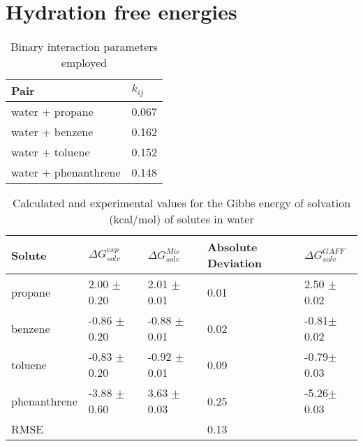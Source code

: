 \section{Hydration free energies}


\begin{table}[h]
\center
  \caption{Binary interaction parameters employed}
  \label{tbl:kij}
  \begin{tabular}{ll}
    \hline
      Pair & $k_{ij}$ \\
    \hline
    water  + propane      & 0.067  \\
    water  + benzene      & 0.162 \\  
    water  + toluene      & 0.152 \\
    water  + phenanthrene & 0.148  \\
    \hline
  \end{tabular}

\end{table}

\begin{table*}[h]
\center
  \caption{Calculated and experimental values for the Gibbs energy of solvation (kcal/mol) of solutes in water}
  \label{tbl:solv2}
  \begin{tabular}{lllll}
    \hline
     Solute      & $\Delta G_{solv}^{exp}$ & $\Delta G_{solv}^{Mie}$ & Absolute Deviation &$\Delta G_{solv}^{GAFF}$ \\
    \hline
    propane      &  2.00 $\pm$ 0.20 & 2.01 $\pm$ 0.01& 0.01 &2.50 $\pm$0.02 \\
    benzene      & -0.86 $\pm$ 0.20 & -0.88 $\pm$ 0.01    &  0.02    &-0.81$\pm$0.02 \\  
    toluene      & -0.83 $\pm$ 0.20 & -0.92 $\pm$ 0.01   &  0.09    &-0.79$\pm$0.03\\
    phenanthrene & -3.88 $\pm$ 0.60 & 3.63 $\pm$ 0.03& 0.25 &-5.26$\pm$0.03 \\
    \hline
    RMSE         &                  &               &  0.13     &      \\
    \hline
  \end{tabular}

\end{table*}
